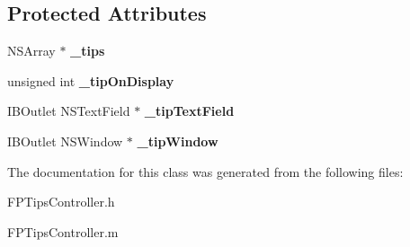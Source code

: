 \subsection*{Protected Attributes}
\begin{DoxyCompactItemize}
\item 
\mbox{\label{interface_f_p_tips_controller_ae06dd91232a6016b89fc3db3edc473a8}} 
N\+S\+Array $\ast$ {\bfseries \+\_\+tips}
\item 
\mbox{\label{interface_f_p_tips_controller_ab027f91ffadcc0514597a60dfcd53255}} 
unsigned int {\bfseries \+\_\+tip\+On\+Display}
\item 
\mbox{\label{interface_f_p_tips_controller_a985f2582cad756037c8d5fc96d87e2e4}} 
I\+B\+Outlet N\+S\+Text\+Field $\ast$ {\bfseries \+\_\+tip\+Text\+Field}
\item 
\mbox{\label{interface_f_p_tips_controller_a55dad897921a153cac3f60bb002da150}} 
I\+B\+Outlet N\+S\+Window $\ast$ {\bfseries \+\_\+tip\+Window}
\end{DoxyCompactItemize}


The documentation for this class was generated from the following files\+:\begin{DoxyCompactItemize}
\item 
F\+P\+Tips\+Controller.\+h\item 
F\+P\+Tips\+Controller.\+m\end{DoxyCompactItemize}
